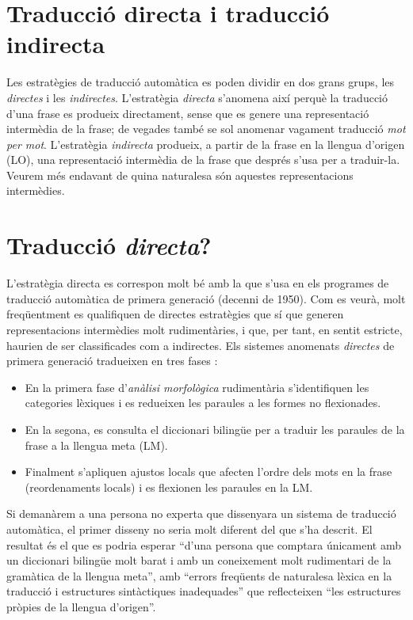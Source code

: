 \section{Traducció directa i traducció indirecta} 
Les
estratègies de traducció automàtica es poden dividir en dos
grans grups, les \emph{directes} i les \emph{indirectes}. L'estratègia
\emph{directa} s'anomena així perquè la traducció d'una frase es
produeix directament, sense que es genere una representació
intermèdia de la frase; de vegades també se sol anomenar vagament
traducció \emph{mot per mot}. L'estratègia \emph{indirecta}
produeix, a partir de la frase en la llengua d'origen (LO), una
representació intermèdia de la frase que després s'usa per a
traduir-la. Veurem més endavant de quina naturalesa són aquestes
representacions intermèdies.


\section{Traducció \emph{directa}?} 
\label{ss:traddir}
L'estratègia directa es correspon molt bé amb la que s'usa en els
programes de traducció automàtica de primera generació (decenni de
1950).  Com es veurà, molt freqüentment es qualifiquen de directes
estratègies que sí que generen representacions intermèdies molt
rudimentàries, i que, per tant, en sentit estricte, haurien de ser
classificades com a indirectes.  Els sistemes anomenats {\em
  directes} de primera generació tradueixen en tres fases
\citep[secció~4.2]{hutchins92b}:
\begin{itemize}
\item En la primera fase d'\emph{anàlisi morfològica}
rudimentària s'identifiquen les categories lèxiques i 
es redueixen les paraules a les formes no flexionades.
\item En la segona, es consulta el diccionari bilingüe per a traduir les
      paraules de la frase a la llengua meta (LM).
\item Finalment s'apliquen ajustos locals que afecten l'ordre dels
      mots en la frase (reordenaments locals) i es flexionen les
      paraules en la LM.
\end{itemize}
Si demanàrem a una persona no experta 
que dissenyara un sistema de traducció automàtica, el primer
disseny no seria molt diferent del que s'ha descrit.
El resultat \citep[secció~4.2]{hutchins92b} és el que
es podria esperar ``d'una persona que comptara únicament amb
un diccionari bilingüe molt barat i amb un coneixement molt rudimentari
de la gramàtica de la llengua meta'', amb ``errors freqüents
de naturalesa lèxica en la traducció i estructures sintàctiques
inadequades'' que reflecteixen ``les estructures pròpies de la llengua
d'origen''.

